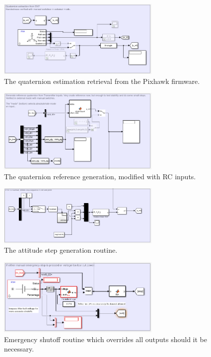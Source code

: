 \documentclass{article}
\begin{document}
\begin{figure}
    \center
    \includegraphics[width=0.7\textwidth]{q_wf.PNG}
    \caption{The quaternion estimation retrieval from the Pixhawk firmware.}
    \label{fig:q_wf}
\end{figure}
\begin{figure}
    \center
    \includegraphics[width=0.7\textwidth]{qref.PNG}
    \caption{The quaternion reference generation, modified with RC inputs.}
    \label{fig:qref}
\end{figure}
\begin{figure}
    \center
    \includegraphics[width=0.7\textwidth]{step.PNG}
    \caption{The attitude step generation routine.}
    \label{fig:step}
\end{figure}
\begin{figure}
    \center
    \includegraphics[width=0.7\textwidth]{stop.PNG}
    \caption{Emergency shutoff routine which overrides all outputs should it be necessary.}
    \label{fig:stop}
\end{figure}
\end{document}
